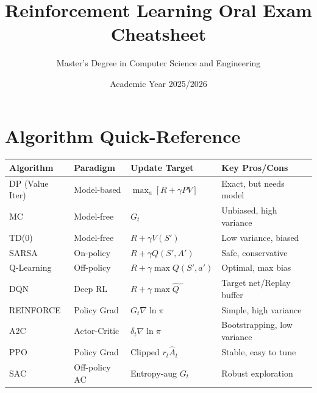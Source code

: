 \documentclass[11pt]{article}
\title{\textbf{Reinforcement Learning Oral Exam Cheatsheet}}
\author{Master's Degree in Computer Science and Engineering}
\date{Academic Year 2025/2026}
\begin{document}
\maketitle

\tableofcontents
\newpage


\newpage

\newpage

\newpage

\newpage

\newpage

\newpage

\newpage

\newpage


\newpage
\section{Algorithm Quick-Reference}

\begin{table}[h]
\centering
\small
\begin{tabular}{@{}llll@{}}
\toprule
\textbf{Algorithm} & \textbf{Paradigm} & \textbf{Update Target} & \textbf{Key Pros/Cons} \\ \midrule
DP (Value Iter) & Model-based & $\max_a [R + \gamma P V]$ & Exact, but needs model \\
MC & Model-free & $G_t$ & Unbiased, high variance \\
TD(0) & Model-free & $R + \gamma V(S')$ & Low variance, biased \\
SARSA & On-policy & $R + \gamma Q(S', A')$ & Safe, conservative \\
Q-Learning & Off-policy & $R + \gamma \max Q(S', a')$ & Optimal, max bias \\
DQN & Deep RL & $R + \gamma \max \hat{Q}^-$ & Target net/Replay buffer \\
REINFORCE & Policy Grad & $G_t \nabla \ln \pi$ & Simple, high variance \\
A2C & Actor-Critic & $\delta_t \nabla \ln \pi$ & Bootstrapping, low variance \\
PPO & Policy Grad & Clipped $r_t \hat{A}_t$ & Stable, easy to tune \\
SAC & Off-policy AC & Entropy-aug $G_t$ & Robust exploration \\ \bottomrule
\end{tabular}
\end{table}
\end{document}
